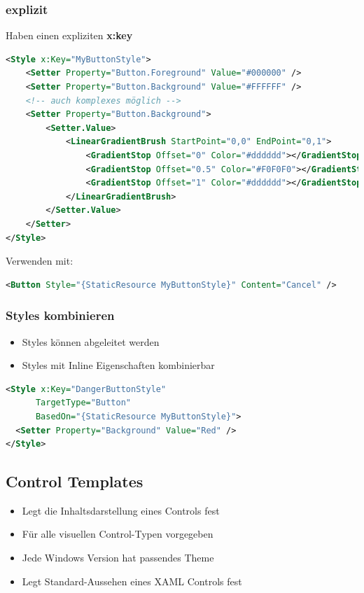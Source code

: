 \subsubsection{explizit}
Haben einen expliziten \textbf{x:key}
\begin{lstlisting}[language=xml]
<Style x:Key="MyButtonStyle">
    <Setter Property="Button.Foreground" Value="#000000" />
    <Setter Property="Button.Background" Value="#FFFFFF" />
    <!-- auch komplexes möglich -->
    <Setter Property="Button.Background">
        <Setter.Value>
            <LinearGradientBrush StartPoint="0,0" EndPoint="0,1">
                <GradientStop Offset="0" Color="#dddddd"></GradientStop>
                <GradientStop Offset="0.5" Color="#F0F0F0"></GradientStop>
                <GradientStop Offset="1" Color="#dddddd"></GradientStop>
            </LinearGradientBrush>
        </Setter.Value>
    </Setter>
</Style>
\end{lstlisting}
Verwenden mit:
\begin{lstlisting}[language=xml]
<Button Style="{StaticResource MyButtonStyle}" Content="Cancel" />
\end{lstlisting}



\subsubsection{Styles kombinieren}
\begin{itemize}
    \item Styles können abgeleitet werden
    \item Styles mit Inline Eigenschaften kombinierbar
\end{itemize}
\begin{lstlisting}[language=xml]
<Style x:Key="DangerButtonStyle" 
      TargetType="Button" 
      BasedOn="{StaticResource MyButtonStyle}"> 
  <Setter Property="Background" Value="Red" /> 
</Style> 
\end{lstlisting}

\subsection{Control Templates}
\begin{itemize}
    \item Legt die Inhaltsdarstellung eines Controls fest
    \item Für alle visuellen Control-Typen vorgegeben
    \item Jede Windows Version hat passendes Theme
    \item Legt Standard-Aussehen eines XAML Controls fest
\end{itemize}

